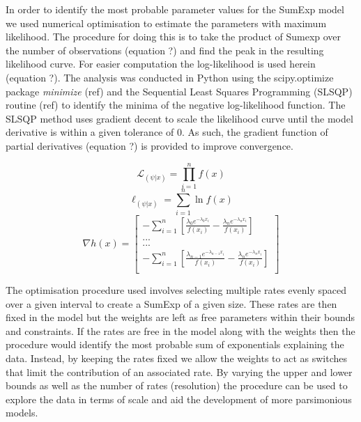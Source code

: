 \documentclass[11pt,usenames,dvipsnames]{article}
\newcommand{\Lagr}{\mathcal{L}}
\begin{document}
In order to identify the most probable parameter values for the SumExp model we used numerical optimisation to estimate the parameters with maximum likelihood. The procedure for doing this is to take the product of Sumexp over the number of observations (equation ?) and find the peak in the resulting likelihood curve. For easier computation the log-likelihood is used herein (equation ?). The analysis was conducted in Python using the scipy.optimize package \textit{minimize} (ref) and the Sequential Least Squares Programming (SLSQP) routine (ref) to identify the minima of the negative log-likelihood function. The SLSQP method uses gradient decent to scale the likelihood curve until the model derivative is within a given tolerance of 0. As such, the gradient function of partial derivatives (equation ?) is provided to improve convergence.

\begin{equation}
\Lagr_{(\psi|x)} = \prod_{i=1}^{n} f(x)
\end{equation} 
\begin{equation}
\ell_{(\psi|x)} = \sum_{i=1}^{n} \ln f(x)
\end{equation} 
\begin{equation}
\nabla h(x) = \begin{bmatrix} -\sum_{i=1}^{n} [\frac{\lambda_0 e^{-\lambda_0 x_i}}{f(x_i)} - \frac{\lambda_n e^{-\lambda_n x_i}}{f(x_i)}] \\
... \\
... \\
-\sum_{i=1}^{n} [\frac{\lambda_{n-1} e^{-\lambda_{n-1} x_i}}{f(x_i)} - \frac{\lambda_n e^{-\lambda_n x_i}}{f(x_i)}] \\
\end{bmatrix}
\end{equation}

The optimisation procedure used involves selecting multiple rates evenly spaced over a given interval to create a SumExp of a given size. These rates are then fixed in the model but the weights are left as free parameters within their bounds and constraints. If the rates are free in the model along with the weights then the procedure would identify the most probable sum of exponentials explaining the data. Instead, by keeping the rates fixed we allow the weights to act as switches that limit the contribution of an associated rate. By varying the upper and lower bounds as well as the number of rates (resolution) the procedure can be used to explore the data in terms of scale and aid the development of more parsimonious models. 
\end{document}
